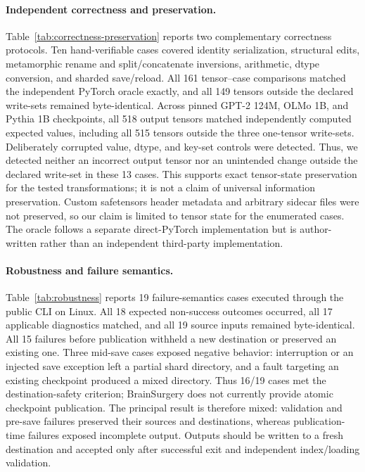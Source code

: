 
\paragraph{Independent correctness and preservation.}
Table~\ref{tab:correctness-preservation} reports two complementary correctness
protocols. Ten hand-verifiable
cases covered identity serialization, structural edits, metamorphic rename and
split/concatenate inversions, arithmetic, dtype conversion, and sharded
save/reload. All 161 tensor--case comparisons matched the independent PyTorch
oracle exactly, and all 149 tensors outside the declared write-sets remained
byte-identical. Across pinned GPT-2 124M, OLMo 1B, and Pythia 1B checkpoints,
all 518 output tensors matched independently computed expected values,
including all 515 tensors outside the three one-tensor write-sets.
Deliberately corrupted value, dtype, and key-set controls were detected.
Thus, we detected neither an incorrect output tensor nor an unintended change
outside the declared write-set in these 13 cases. This supports exact
tensor-state preservation for the tested transformations; it is not a claim of
universal information preservation.
Custom safetensors header metadata and arbitrary sidecar files were not
preserved, so our claim is limited to tensor state for the enumerated cases.
The oracle follows a separate direct-PyTorch implementation but is
author-written rather than an independent third-party implementation.

\paragraph{Robustness and failure semantics.}
Table~\ref{tab:robustness} reports 19 failure-semantics cases executed through
the public CLI on Linux. All 18
expected non-success outcomes occurred, all 17 applicable diagnostics matched,
and all 19 source inputs remained byte-identical. All 15 failures before
publication withheld a new destination or preserved an existing one. Three
mid-save cases exposed negative behavior: interruption or an injected save
exception left a partial shard directory, and a fault targeting an existing
checkpoint produced a mixed directory. Thus 16/19 cases met the
destination-safety criterion; BrainSurgery does not currently provide atomic
checkpoint publication. The principal result is therefore mixed: validation
and pre-save failures preserved their sources and destinations, whereas
publication-time failures exposed incomplete output. Outputs should be written to a fresh destination and
accepted only after successful exit and independent index/loading validation.


